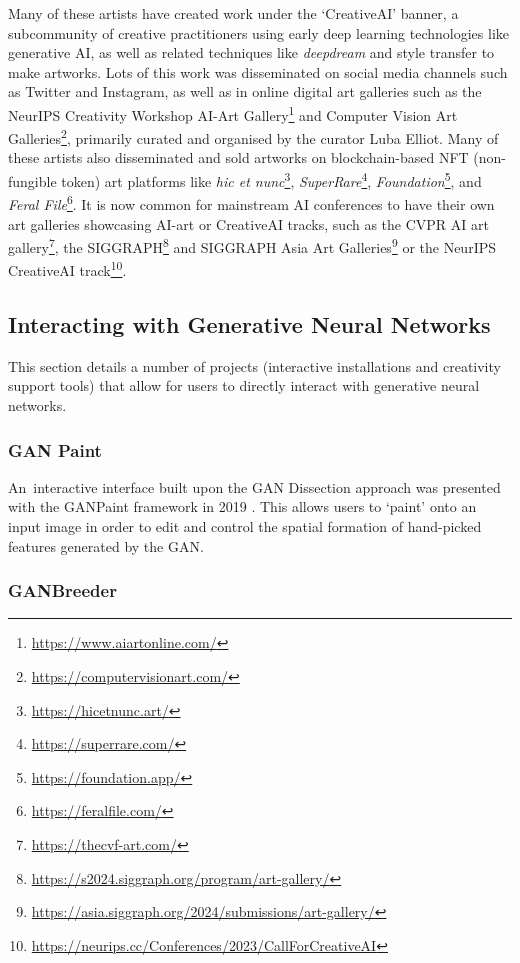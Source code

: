 Many of these artists have created work under the `CreativeAI' banner, a subcommunity of creative practitioners using early deep learning technologies like generative AI, as well as related techniques like \textit{deepdream} and style transfer \citep{gatys2016neural} to make artworks. 
Lots of this work was disseminated on social media channels such as Twitter and Instagram, as well as in online digital art galleries such as the NeurIPS Creativity Workshop AI-Art Gallery\footnote{\url{https://www.aiartonline.com/}} and Computer Vision Art Galleries\footnote{\url{https://computervisionart.com/}}, primarily curated and organised by the curator Luba Elliot. 
Many of these artists also disseminated and sold artworks on blockchain-based NFT (non-fungible token) art platforms like \textit{hic et nunc}\footnote{\url{https://hicetnunc.art/}}, \textit{SuperRare}\footnote{\url{https://superrare.com/}}, \textit{Foundation}\footnote{\url{https://foundation.app/}}, and \textit{Feral File}\footnote{\url{https://feralfile.com/}}. 
It is now common for mainstream AI conferences to have their own art galleries showcasing AI-art or CreativeAI tracks, such as the CVPR AI art gallery\footnote{\url{https://thecvf-art.com/}}, the SIGGRAPH\footnote{\url{https://s2024.siggraph.org/program/art-gallery/}} and SIGGRAPH Asia Art Galleries\footnote{\url{https://asia.siggraph.org/2024/submissions/art-gallery/}} or the NeurIPS CreativeAI track\footnote{\url{https://neurips.cc/Conferences/2023/CallForCreativeAI}}.

\subsection{Interacting with Generative Neural Networks} 

This section details a number of projects (interactive installations and creativity support tools) that allow for users to directly interact with generative neural networks.

\subsubsection{GAN Paint}

An~interactive interface built upon the GAN Dissection approach \citep{Bau2018-td} was presented with the GANPaint framework in 2019 \citep{bau2019semantic}. 
This allows users to `paint' onto an input image in order to edit and control the spatial formation of hand-picked features generated by the GAN. 

\subsubsection{GANBreeder}

